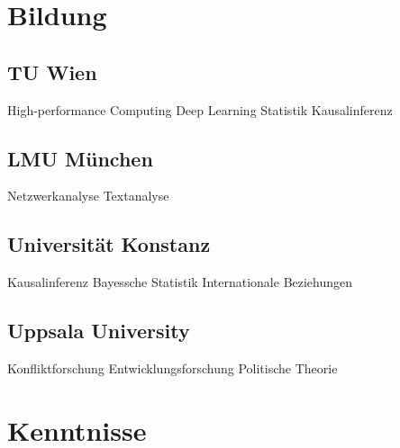 \documentclass[letterpaper]{deedy-resume} %
\begin{document}
\begin{minipage}[t]{0.33\textwidth} %


\section{Bildung} 

\subsection{TU Wien}
High-performance Computing \textbullet{} Deep Learning \textbullet{} Statistik \textbullet{} Kausalinferenz \\
\sectionspace

\subsection{LMU München}
Netzwerkanalyse \textbullet{} Textanalyse \\
\sectionspace

\subsection{Universität Konstanz}
Kausalinferenz \textbullet{} Bayessche Statistik \textbullet{} Internationale Beziehungen \\
\sectionspace

\subsection{Uppsala University}
Konfliktforschung \textbullet{} Entwicklungsforschung \textbullet{} Politische Theorie \\
\sectionspace


\section{Kenntnisse}


\end{minipage}
\end{document}
